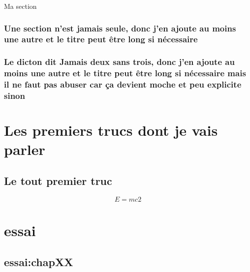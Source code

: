 \documentclass[bare]{polytech/polytech}
\begin{document}
\label{chap0:para}

\lipsum[1-3]

\subparagraph{Ma section}

\label{chap0:subpara}

\lipsum[1-3]

\section{Une section n'est jamais seule, donc j'en ajoute au moins une autre et le titre peut être long si nécessaire}

\lipsum[1-3]
                       
                       
           
     
\section{Le dicton dit \og{}Jamais deux sans trois\fg{}, donc j'en ajoute au moins une autre et le titre peut être long si nécessaire mais il ne faut pas abuser car ça devient moche et peu explicite sinon}

\lipsum[1-3] 

\part{Les premiers trucs dont je vais parler}                
\label{part:premierstrucs}

\chapter{Le tout premier truc}   
\label{chap:toutpremier}

\begin{equation}
\label{eq:2} 
E=mc2
\end{equation}       
  
  

\lipsum[1]
           

\part{essai}
\label{part:essai}
 
 \chapter{essai:chapXX}
 
\end{document}
